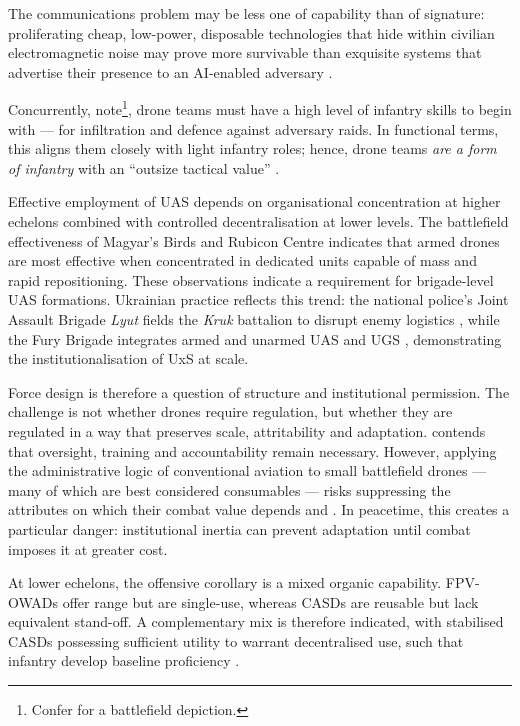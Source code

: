 The communications problem may be less one of capability than of signature: proliferating cheap, low-power, disposable technologies that hide within civilian electromagnetic noise may prove more survivable than exquisite systems that advertise their presence to an AI-enabled adversary \parencite[9,~18]{Birchfield_2026,USMC_MOC_2016}.

Concurrently, \textcite{dan_participant_1,Leach_curtain} note\footnote{Confer \textcite{civdiv_2024_10_05} for a battlefield depiction.}, drone teams must have a high level of infantry skills to begin with --- for infiltration and defence against adversary raids. In functional terms, this aligns them closely with light infantry roles; hence, drone teams \textit{are a form of infantry} with an ``outsize tactical value'' \parencite[26]{hvizda_2025}.


Effective employment of UAS depends on organisational concentration at higher echelons combined with controlled decentralisation at lower levels. The battlefield effectiveness of Magyar's Birds and Rubicon Centre indicates that armed drones are most effective when concentrated in dedicated units capable of mass and rapid repositioning. These observations indicate a requirement for brigade-level UAS formations. Ukrainian practice reflects this trend: the national police's Joint Assault Brigade \textit{Lyut} fields the \textit{Kruk} battalion to disrupt enemy logistics \parencite{NPU_Lyut_Kruk_2026}, while the Fury Brigade integrates armed and unarmed UAS and UGS \parencite{Militarnyi_Kruk_2026}, demonstrating the institutionalisation of UxS at scale.

Force design is therefore a question of structure and institutional permission. The challenge is not whether drones require regulation, but whether they are regulated in a way that preserves scale, attritability and adaptation. \textcite{goc_participant_3} contends that oversight, training and accountability remain necessary. However, applying the administrative logic of conventional aviation to small battlefield drones --- many of which are best considered consumables --- risks suppressing the attributes on which their combat value depends \parencite[57--58]{ZABRODSKYI_2022} and \parencite[51:30--54:15]{WATLING_2023_book_launch}. In peacetime, this creates a particular danger: institutional inertia can prevent adaptation until combat imposes it at greater cost.

At lower echelons, the offensive corollary is a mixed organic capability. FPV-OWADs offer range but are single-use, whereas CASDs are reusable but lack equivalent stand-off. A complementary mix is therefore indicated, with stabilised CASDs possessing sufficient utility to warrant decentralised use, such that infantry develop baseline proficiency \parencite[24:00--25:00]{Leach_curtain}.

